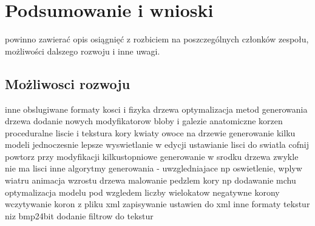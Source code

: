 

\chapter{Podsumowanie i wnioski}
powinno zawierać opis osiągnięć z rozbiciem na poszczególnych
członków zespołu, możliwości dalszego rozwoju i inne uwagi.
\section{Możliwosci rozwoju}
inne obslugiwane formaty
kosci i fizyka drzewa
optymalizacja metod generowania drzewa
dodanie nowych modyfikatorow
bloby i galezie anatomiczne
korzen
proceduralne liscie i tekstura kory
kwiaty owoce na drzewie
generowanie kilku modeli jednoczesnie
lepsze wyswietlanie w edycji
ustawianie lisci do swiatla
cofnij powtorz przy modyfikacji
kilkustopniowe generowanie
w srodku drzewa zwykle nie ma lisci 
inne algorytmy generowania  - uwzgledniajace np oswietlenie, wplyw wiatru
animacja wzrostu drzewa
malowanie pedzlem kory np dodawanie mchu
optymalizacja modelu pod wzgledem liczby wielokatow
negatywne korony
wczytywanie koron z pliku xml
zapisywanie ustawien do xml
inne formaty tekstur niz bmp24bit
dodanie filtrow do tekstur
